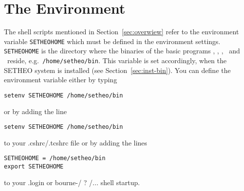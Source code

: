 %
\section{The Environment}\label{sec:environ}

The shell scripts mentioned in Section~\ref{sec:overwiew} refer to the
environment variable {\tt SETHEOHOME} which must be defined in the
environment settings. {\tt SETHEOHOME} is the directory where the
binaries of the basic programs \plop, \inw, \wasm, \sam\ and \xp\
reside, e.g.\ {\tt /home/setheo/bin}. This variable is set accordingly,
when the SETHEO system is installed (see Section~\ref{sec:inst-bin}).
You can define the environment variable either by typing 
\begin{verbatim}
setenv SETHEOHOME /home/setheo/bin
\end{verbatim}
or by adding the line
\begin{verbatim}
setenv SETHEOHOME /home/setheo/bin
\end{verbatim}
to your .cshrc/.tcshrc file or by adding the lines
\begin{verbatim}
SETHEOHOME = /home/setheo/bin
export SETHEOHOME
\end{verbatim}
to your .login or bourne-/ ? /... shell startup.
